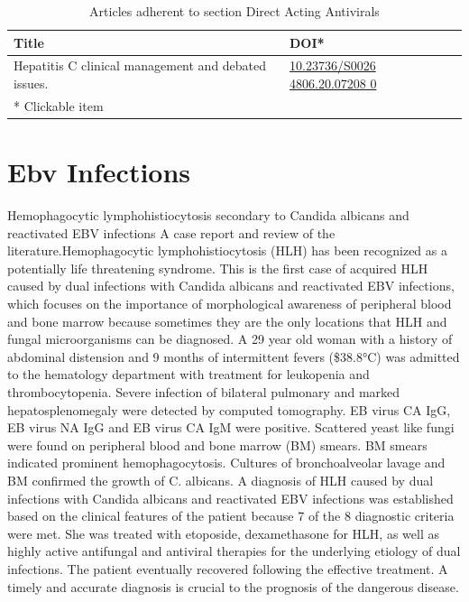 \documentclass{qqtarticle}
\begin{document}
    \begin{table}[H]
    \scriptsize
    \centering
    \caption{Articles adherent to section Direct Acting Antivirals}
    \renewcommand{\arraystretch}{1.5}
    \begin{tabular}{p{}l}
        \toprule 
        Title & DOI* \\     \midrule Hepatitis C  clinical management and debated issues. \cite{Hepatitisf57af4b3} & \href{https://dx.doi.org/10.23736/S0026 4806.20.07208 0}{10.23736/S0026 4806.20.07208 0}\\     \midrule
        * Clickable item \\
        \bottomrule
    \end{tabular}
    \label{tab:topic4}
    \end{table}
    
    \section{Ebv Infections}
        Hemophagocytic lymphohistiocytosis secondary to Candida albicans and reactivated EBV 
        infections  A case report and review of the literature.Hemophagocytic lymphohistiocytosis 
        (HLH) has been recognized as a potentially life threatening syndrome. This is the first case 
        of acquired HLH caused by dual infections with Candida albicans and reactivated EBV infections,
         which focuses on the importance of morphological awareness of peripheral blood and bone marrow
          because sometimes they are the only locations that HLH and fungal microorganisms can be 
          diagnosed. A 29 year old woman with a history of abdominal distension and 9 months of 
          intermittent fevers (\$38.8°C) was admitted to the hematology department with treatment for 
          leukopenia and thrombocytopenia. Severe infection of bilateral pulmonary and marked 
          hepatosplenomegaly were detected by computed tomography. EB virus CA IgG, EB virus NA 
          IgG and EB virus CA IgM were positive. Scattered yeast like fungi were found on peripheral 
          blood and bone marrow (BM) smears. BM smears indicated prominent hemophagocytosis. Cultures 
          of bronchoalveolar lavage and BM confirmed the growth of C. albicans. A diagnosis of HLH 
          caused by dual infections with Candida albicans and reactivated EBV infections was 
          established based on the clinical features of the patient because 7 of the 8 diagnostic 
          criteria were met. She was treated with etoposide, dexamethasone for HLH, as well as highly 
          active antifungal and antiviral therapies for the underlying etiology of dual infections. 
          The patient eventually recovered following the effective treatment. 
          A timely and accurate diagnosis is crucial to the prognosis of the dangerous disease.
\end{document}
